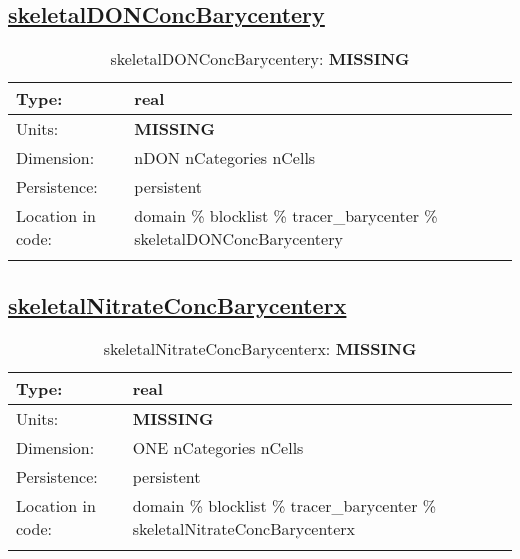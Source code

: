 \subsection[skeletalDONConcBarycentery]{\hyperref[sec:var_tab_tracer_barycenter]{skeletalDONConcBarycentery}}
\label{subsec:var_sec_tracer_barycenter_skeletalDONConcBarycentery}
\begin{center}
\begin{longtable}{| p{2.0in} | p{4.0in} |}
        \hline 
        Type: & real \\
        \hline 
        Units: & {\bf \color{red} MISSING} \\
        \hline 
        Dimension: & nDON nCategories nCells \\
        \hline 
        Persistence: & persistent \\
        \hline 
         Location in code: & domain \% blocklist \% tracer\_barycenter \% skeletalDONConcBarycentery \\
         \hline 
    \caption{skeletalDONConcBarycentery: {\bf \color{red} MISSING}}
\end{longtable}
\end{center}
\subsection[skeletalNitrateConcBarycenterx]{\hyperref[sec:var_tab_tracer_barycenter]{skeletalNitrateConcBarycenterx}}
\label{subsec:var_sec_tracer_barycenter_skeletalNitrateConcBarycenterx}
\begin{center}
\begin{longtable}{| p{2.0in} | p{4.0in} |}
        \hline 
        Type: & real \\
        \hline 
        Units: & {\bf \color{red} MISSING} \\
        \hline 
        Dimension: & ONE nCategories nCells \\
        \hline 
        Persistence: & persistent \\
        \hline 
         Location in code: & domain \% blocklist \% tracer\_barycenter \% skeletalNitrateConcBarycenterx \\
         \hline 
    \caption{skeletalNitrateConcBarycenterx: {\bf \color{red} MISSING}}
\end{longtable}
\end{center}
